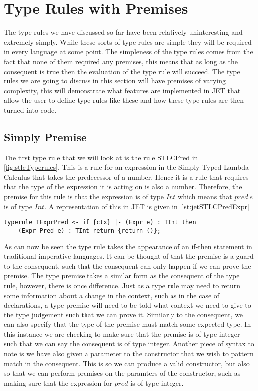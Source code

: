 \section{Type Rules with Premises}
The type rules we have discussed so far have been relatively uninteresting and extremely simply.
While these sorts of type rules are simple they will be required in every language at some point.
The simpleness of the type rules comes from the fact that none of them required any premises, this means that as long as the consequent is true then the evaluation of the type rule will succeed.
The type rules we are going to discuss in this section will have premises of varying complexity, this will demonstrate what features are implemented in JET that allow the user to define type rules like these and how these type rules are then turned into code.

\subsection{Simply Premise}
The first type rule that we will look at is the rule STLCPred in \autoref{fig:stlcTyperules}.
This is a rule for an expression in the Simply Typed Lambda Calculus that takes the predecessor of a number.
Hence it is a rule that requires that the type of the expression it is acting on is also a number.
Therefore, the premise for this rule is that the expression is of type $Int$ which means that $pred\ e$ is of type $Int$.
A representation of this in JET is given in \autoref{lst:jetSTLCPredExpr}

\begin{lstlisting}[caption = Type rule for pred expression involving one premise, label=lst:jetSTLCPredExpr]
typerule TExprPred <- if {ctx} |- (Expr e) : TInt then 
    (Expr Pred e) : TInt return {return ()};
\end{lstlisting}

As can now be seen the type rule takes the appearance of an if-then statement in traditional imperative languages.
It can be thought of that the premise is a guard to the consequent, such that the consequent can only happen if we can prove the premise.
The type premise takes a similar form as the consequent of the type rule, however, there is once difference.
Just as a type rule may need to return some information about a change in the context, such as in the case of declarations, a type premise will need to be told what context we need to give to the type judgement such that we can prove it.
Similarly to the consequent, we can also specify that the type of the premise must match some expected type.
In this instance we are checking to make sure that the premise is of type integer such that we can say the consequent is of type integer.
Another piece of syntax to note is we have also given a parameter to the constructor that we wish to pattern match in the consequent.
This is so we can produce a valid constructor, but also so that we can perform premises on the paramters of the constructor, such as making sure that the expression for $pred$ is of type integer.

